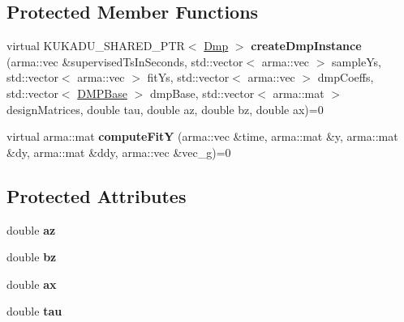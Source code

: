 \subsection*{Protected Member Functions}
\begin{DoxyCompactItemize}
\item 
virtual K\+U\+K\+A\+D\+U\+\_\+\+S\+H\+A\+R\+E\+D\+\_\+\+P\+TR$<$ \hyperlink{classkukadu_1_1Dmp}{Dmp} $>$ {\bfseries create\+Dmp\+Instance} (arma\+::vec \&supervised\+Ts\+In\+Seconds, std\+::vector$<$ arma\+::vec $>$ sample\+Ys, std\+::vector$<$ arma\+::vec $>$ fit\+Ys, std\+::vector$<$ arma\+::vec $>$ dmp\+Coeffs, std\+::vector$<$ \hyperlink{classkukadu_1_1DMPBase}{D\+M\+P\+Base} $>$ dmp\+Base, std\+::vector$<$ arma\+::mat $>$ design\+Matrices, double tau, double az, double bz, double ax)=0\hypertarget{classkukadu_1_1GeneralDmpLearner_ac09b61a9d1fc81a4d32b00e8a27c9a37}{}\label{classkukadu_1_1GeneralDmpLearner_ac09b61a9d1fc81a4d32b00e8a27c9a37}

\item 
virtual arma\+::mat {\bfseries compute\+FitY} (arma\+::vec \&time, arma\+::mat \&y, arma\+::mat \&dy, arma\+::mat \&ddy, arma\+::vec \&vec\+\_\+g)=0\hypertarget{classkukadu_1_1GeneralDmpLearner_a5df8ee4640adf585cbce7b04e77ae3a6}{}\label{classkukadu_1_1GeneralDmpLearner_a5df8ee4640adf585cbce7b04e77ae3a6}

\end{DoxyCompactItemize}
\subsection*{Protected Attributes}
\begin{DoxyCompactItemize}
\item 
double {\bfseries az}\hypertarget{classkukadu_1_1GeneralDmpLearner_abccf72154087561579ce0abe1ff85ff3}{}\label{classkukadu_1_1GeneralDmpLearner_abccf72154087561579ce0abe1ff85ff3}

\item 
double {\bfseries bz}\hypertarget{classkukadu_1_1GeneralDmpLearner_ad910f3a86c8551f63c643347ae4f15fe}{}\label{classkukadu_1_1GeneralDmpLearner_ad910f3a86c8551f63c643347ae4f15fe}

\item 
double {\bfseries ax}\hypertarget{classkukadu_1_1GeneralDmpLearner_ab6b6b3fa49ef6c7925dbe34ea5991f48}{}\label{classkukadu_1_1GeneralDmpLearner_ab6b6b3fa49ef6c7925dbe34ea5991f48}

\item 
double {\bfseries tau}\hypertarget{classkukadu_1_1GeneralDmpLearner_af27b307365984e9deae829ca2159ed57}{}\label{classkukadu_1_1GeneralDmpLearner_af27b307365984e9deae829ca2159ed57}

\end{DoxyCompactItemize}


